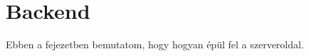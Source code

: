 \chapter{Backend}
\label{chapt:birdmap-backend}
Ebben a fejezetben bemutatom, hogy hogyan épül fel a szerveroldal.